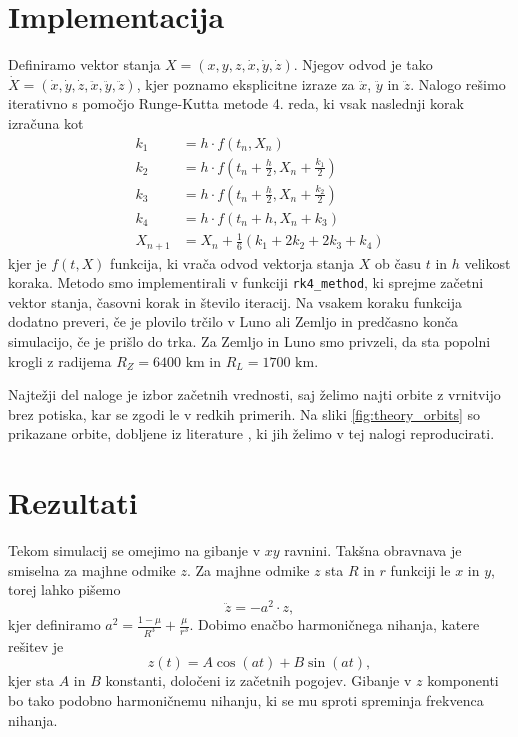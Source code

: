 \documentclass[11pt, titlepage]{article}
\begin{document}
\section{Implementacija}
Definiramo vektor stanja $X = (x, y, z, \dot{x}, \dot{y}, \dot{z})$. Njegov odvod je tako $\dot{X} = (\dot{x}, \dot{y}, \dot{z}, \ddot{x}, \ddot{y}, \ddot{z})$, kjer poznamo eksplicitne izraze za $\ddot{x}$, $\ddot{y}$ in $\ddot{z}$.
Nalogo rešimo iterativno s pomočjo Runge-Kutta metode 4. reda, ki vsak naslednji korak izračuna kot
\begin{align*}
k_1 &= h \cdot f(t_n, X_n) \\
k_2 &= h \cdot f(t_n + \frac{h}{2}, X_n + \frac{k_1}{2}) \\
k_3 &= h \cdot f(t_n + \frac{h}{2}, X_n + \frac{k_2}{2}) \\
k_4 &= h \cdot f(t_n + h, X_n + k_3) \\
X_{n+1} &= X_n + \frac{1}{6}(k_1 + 2k_2 + 2k_3 + k_4)
\end{align*}
kjer je $f(t, X)$ funkcija, ki vrača odvod vektorja stanja $X$ ob času $t$ in $h$ velikost koraka. Metodo smo implementirali v funkciji \texttt{rk4\_method}, ki sprejme začetni vektor stanja, časovni korak in število iteracij. Na vsakem koraku funkcija dodatno preveri,
če je plovilo trčilo v Luno ali Zemljo in predčasno konča simulacijo, če je prišlo do trka. Za Zemljo in Luno smo privzeli, da sta popolni krogli z radijema $R_Z = 6400 \text{ km}$ in $R_L = 1700 \text{ km}$.

Najtežji del naloge je izbor začetnih vrednosti, saj želimo najti orbite z vrnitvijo brez potiska, kar se zgodi le v redkih primerih.
Na sliki \ref{fig:theory_orbits} so prikazane orbite, dobljene iz literature \cite{XIYUN2013183}, ki jih želimo v tej nalogi reproducirati.

\section{Rezultati}
Tekom simulacij se omejimo na gibanje v $xy$ ravnini. Takšna obravnava je smiselna za majhne odmike $z$.
Za majhne odmike $z$ sta $R$ in $r$ funkciji le $x$ in $y$, torej lahko pišemo
$$
\ddot{z} = - a^2 \cdot z,
$$
kjer definiramo $a^2 = \frac{1 - \mu}{R^3} + \frac{\mu}{r^3}$. Dobimo enačbo harmoničnega nihanja, katere rešitev je
$$
z(t) = A \cos(at) + B \sin(at),
$$
kjer sta $A$ in $B$ konstanti, določeni iz začetnih pogojev. Gibanje v $z$ komponenti bo tako podobno harmoničnemu nihanju, ki se mu sproti spreminja frekvenca nihanja. 
\end{document}
